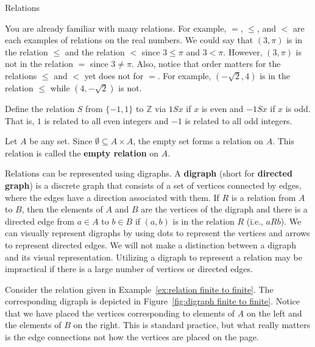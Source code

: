 \begin{section}{Relations}
\begin{example}
You are already familiar with many relations.  For example, $=$, $\leq$, and $<$ are each examples of relations on the real numbers. We could say that $(3,\pi)$ is in the relation $\leq$ and the relation $<$ since $3\leq \pi$ and $3<\pi$.  However, $(3,\pi)$ is not in the relation $=$ since $3\neq \pi$.  Also, notice that order matters for the relations $\leq$ and $<$ yet does not for $=$. For example, $(-\sqrt{2}, 4)$ is in the relation $\leq$ while $(4,-\sqrt{2})$ is not.
\end{example}


\begin{example}
Define the relation $S$ from $\{-1,1\}$ to $\mathbb{Z}$ via $1Sx$ if $x$ is even and $-1Sx$ if $x$ is odd.  That is, $1$ is related to all even integers and $-1$ is related to all odd integers.
\end{example}

\begin{example}
Let $A$ be any set.  Since $\emptyset \subseteq A\times A$, the empty set forms a relation on $A$. This relation is called the \textbf{empty relation} on $A$.
\end{example}

Relations can be represented using digraphs. A \textbf{digraph} (short for \textbf{directed graph}) is a discrete graph that consists of a set of vertices connected by edges, where the edges have a direction associated with them. If $R$ is a relation from $A$ to $B$, then the elements of $A$ and $B$ are the vertices of the digraph and there is a directed edge from $a\in A$ to $b\in B$ if $(a,b)$ is in the relation $R$ (i.e., $aR b$). We can visually represent digraphs by using dots to represent the vertices and arrows to represent directed edges. We will not make a distinction between a digraph and its visual representation. Utilizing a digraph to represent a relation may be impractical if there is a large number of vertices or directed edges. 

\begin{example}
Consider the relation given in Example~\ref{ex:relation finite to finite}.  The corresponding digraph is depicted in Figure~\ref{fig:digraph finite to finite}. Notice that we have placed the vertices corresponding to elements of $A$ on the left and the elements of $B$ on the right.  This is standard practice, but what really matters is the edge connections not how the vertices are placed on the page.
\end{example}


\end{section}
